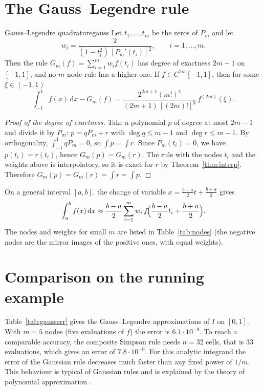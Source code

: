 \documentclass[11pt,a4paper,twoside,openright]{book}
\newcommand{\dd}{\,\mathrm{d}}
\begin{document}
\section{The Gauss--Legendre rule}
\begin{theorem}{Gauss--Legendre quadrature}{gauss}
Let $t_1,\dots,t_m$ be the zeros of $P_m$ and let
\[
  w_i=\frac{2}{(1-t_i^{2})\,[P_m'(t_i)]^{2}},\qquad i=1,\dots,m .
\]
Then the rule $G_m(f)=\sum_{i=1}^{m}w_i f(t_i)$ has degree of exactness $2m-1$ on $[-1,1]$, and no $m$-node rule has a higher one.
If $f\in C^{2m}[-1,1]$, then for some $\xi\in(-1,1)$
\[
  \int_{-1}^{1}f(x)\dd x-G_m(f)=\frac{2^{2m+1}(m!)^{4}}{(2m+1)\,[(2m)!]^{3}}\,f^{(2m)}(\xi).
\]
\end{theorem}
\begin{proof}[Proof of the degree of exactness]
Take a polynomial $p$ of degree at most $2m-1$ and divide it by $P_m$: $p=qP_m+r$ with $\deg q\le m-1$ and $\deg r\le m-1$.
By orthogonality, $\int_{-1}^{1}qP_m=0$, so $\int p=\int r$.
Since $P_m(t_i)=0$, we have $p(t_i)=r(t_i)$, hence $G_m(p)=G_m(r)$.
The rule with the nodes $t_i$ and the weights above is interpolatory, so it is exact for $r$ by Theorem~\ref{thm:interp}. Therefore $G_m(p)=G_m(r)=\int r=\int p$.
\end{proof}

On a general interval $[a,b]$, the change of variable $x=\frac{b-a}{2}t+\frac{b+a}{2}$ gives
\[
  \int_a^b f(x)\dd x\approx\frac{b-a}{2}\sum_{i=1}^{m}w_i\,f\!\Bigl(\frac{b-a}{2}t_i+\frac{b+a}{2}\Bigr).
\]
The nodes and weights for small $m$ are listed in Table~\ref{tab:nodes} (the negative nodes are the mirror images of the positive ones, with equal weights).

\begin{table}[htbp]
  \centering
  \caption{Gauss--Legendre nodes and weights on $[-1,1]$, computed by the script \texttt{book\_data.py}.}
  \label{tab:nodes}
  
\end{table}

\section{Comparison on the running example}
Table~\ref{tab:gausserr} gives the Gauss--Legendre approximations of $I$ on $[0,1]$.
With $m=5$ nodes (five evaluations of $f$) the error is $6.1\cdot10^{-9}$.
To reach a comparable accuracy, the composite Simpson rule needs $n=32$ cells, that is $33$ evaluations, which gives an error of $7.8\cdot10^{-9}$.
For this analytic integrand the error of the Gaussian rule decreases much faster than any fixed power of $1/m$.
This behaviour is typical of Gaussian rules and is explained by the theory of polynomial approximation \parencite{trefethen2008,trefethen2013}.
\end{document}
